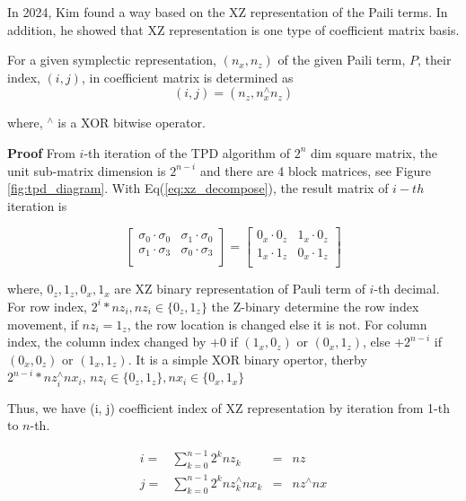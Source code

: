 In 2024, Kim found a way based on the XZ representation of the 
Paili terms. In addition, he showed that XZ representation is one type of 
coefficient matrix basis.

\begin{theorem}
    For a given symplectic representation, $(n_x, n_z)$ of the given Paili term, $P$,
    their index, $(i, j)$, in coefficient matrix is determined as 
    $$(i, j) = (n_z, n_x^\wedge n_z)$$

    where, ${}^\wedge$ is a XOR bitwise operator. 
\end{theorem}

\textbf{Proof} 
From $i$-th iteration of the TPD algorithm of $2^n$ dim square matrix, 
the unit sub-matrix dimension is $2^{n-i}$ and there are 4 block matrices, see Figure \ref{fig:tpd_diagram}.
With Eq(\ref{eq:xz_decompose}), the result matrix of $i-th$ iteration is

\begin{equation}
    \begin{bmatrix}
        \sigma_0 \cdot \sigma_0 & \sigma_1 \cdot \sigma_0\\
        \sigma_1 \cdot \sigma_3 & \sigma_0 \cdot \sigma_3\\
    \end{bmatrix}
    = 
    \begin{bmatrix}
        0_x \cdot 0_z & 1_x \cdot 0_z\\
        1_x \cdot 1_z & 0_x \cdot 1_z\\
    \end{bmatrix}
\end{equation}

where, $0_z, 1_z, 0_x, 1_x$ are XZ binary representation of Pauli term of $i$-th decimal.
For row index, $2^{i} * nz_i, nz_i\in \{0_z, 1_z\}$ the Z-binary determine
the row index movement, if $nz_i = 1_z$, the row location is changed else it is not.
For column index, the column index changed by $+0$ if $(1_x, 0_z)$ or $(0_x, 1_z)$, 
else $+2^{n-i}$ if $(0_x, 0_z)$ or $(1_x, 1_z)$.
It is a simple XOR binary opertor, therby 
$2^{n-i} * nz_i^{\wedge}nx_i, \, nz_i\in \{0_z, 1_z\}, nx_i \in \{0_x, 1_x\}$

Thus, we have (i, j) coefficient index of XZ representation by iteration from 1-th to $n$-th. 

\begin{equation}
    \begin{array}{clcc}
    i =& \sum_{k=0}^{n-1} 2^{k} nz_k &=& nz\\
    j =& \sum_{k=0}^{n-1} 2^{k} nz_k^{\wedge} nx_k &=& nz^{\wedge}nx
    \end{array}
\end{equation}

